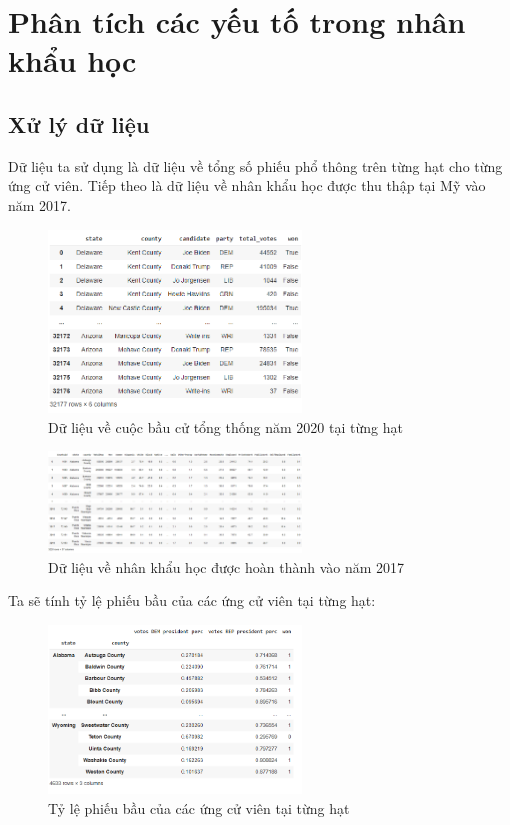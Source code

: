 \documentclass[14pt, a4paper]{article}
\numberwithin{equation}{section}
\numberwithin{figure}{section}
\numberwithin{dl}{section}
\numberwithin{md}{section}
\numberwithin{bd}{section}
\numberwithin{dn}{section}
\numberwithin{hq}{section}
\begin{document}
    \section{Phân tích các yếu tố trong nhân khẩu học}

    \subsection{Xử lý dữ liệu}

    Dữ liệu ta sử dụng là dữ liệu về tổng số phiếu phổ thông trên từng hạt cho từng ứng cử viên.
    Tiếp theo là dữ liệu về nhân khẩu học được thu thập tại Mỹ vào năm 2017.

    \begin{figure}[h!]
        \centering
        \includegraphics[width=0.6\textwidth]{figures/President_Dataframe.png}
        \caption{Dữ liệu về cuộc bầu cử tổng thống năm 2020 tại từng hạt}
    \end{figure}

    \begin{figure}[h!]
        \centering
        \includegraphics[width=0.6\textwidth]{figures/Census_Dataframe.png}
        \caption{Dữ liệu về nhân khẩu học được hoàn thành vào năm 2017}
    \end{figure}

    Ta sẽ tính tỷ lệ phiếu bầu của các ứng cử viên tại từng hạt:

    \begin{figure}[h!]
        \centering
        \includegraphics[width=0.6\textwidth]{figures/President_Dataframe_Rep_Dem_Percentage.png}
        \caption{Tỷ lệ phiếu bầu của các ứng cử viên tại từng hạt}
    \end{figure}
\end{document}
